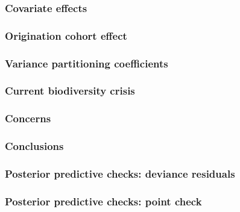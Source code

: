 \documentclass{beamer}
\begin{document}
\begin{frame}
  \frametitle{Covariate effects}
\end{frame}

\begin{frame}
  \frametitle{Origination cohort effect}
\end{frame}

\begin{frame}
  \frametitle{Variance partitioning coefficients}
\end{frame}

\begin{frame}
  \frametitle{Current biodiversity crisis}
\end{frame}

\begin{frame}
  \frametitle{Concerns}
\end{frame}

\begin{frame}
  \frametitle{Conclusions}
\end{frame}

\appendix

\begin{frame}
\end{frame}

\begin{frame}
  \frametitle{Posterior predictive checks: deviance residuals}
\end{frame}

\begin{frame}
  \frametitle{Posterior predictive checks: point check}
\end{frame}
\end{document}
